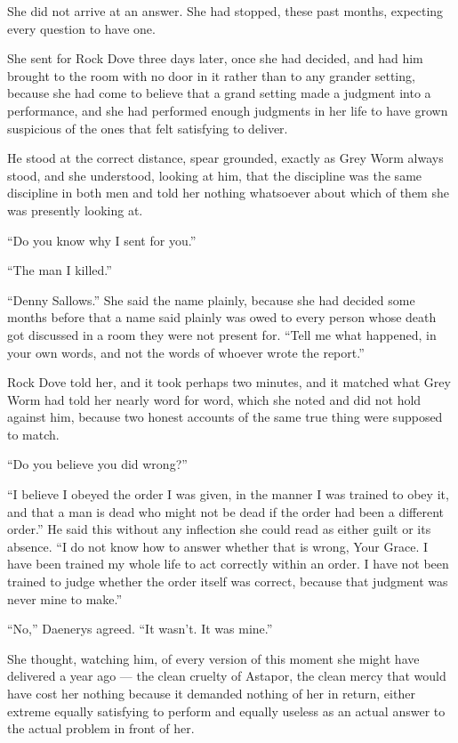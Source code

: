 She did not arrive at an answer. She had stopped, these past months, expecting every question to have one.

\sceneBreak

She sent for Rock Dove three days later, once she had decided, and had him brought to the room with no door in it rather than to any grander setting, because she had come to believe that a grand setting made a judgment into a performance, and she had performed enough judgments in her life to have grown suspicious of the ones that felt satisfying to deliver.

He stood at the correct distance, spear grounded, exactly as Grey Worm always stood, and she understood, looking at him, that the discipline was the same discipline in both men and told her nothing whatsoever about which of them she was presently looking at.

“Do you know why I sent for you.”

“The man I killed.”

“Denny Sallows.” She said the name plainly, because she had decided some months before that a name said plainly was owed to every person whose death got discussed in a room they were not present for. “Tell me what happened, in your own words, and not the words of whoever wrote the report.”

Rock Dove told her, and it took perhaps two minutes, and it matched what Grey Worm had told her nearly word for word, which she noted and did not hold against him, because two honest accounts of the same true thing were supposed to match.

“Do you believe you did wrong?”

“I believe I obeyed the order I was given, in the manner I was trained to obey it, and that a man is dead who might not be dead if the order had been a different order.” He said this without any inflection she could read as either guilt or its absence. “I do not know how to answer whether that is wrong, Your Grace. I have been trained my whole life to act correctly within an order. I have not been trained to judge whether the order itself was correct, because that judgment was never mine to make.”

“No,” Daenerys agreed. “It wasn’t. It was mine.”

\sceneBreak

She thought, watching him, of every version of this moment she might have delivered a year ago — the clean cruelty of Astapor, the clean mercy that would have cost her nothing because it demanded nothing of her in return, either extreme equally satisfying to perform and equally useless as an actual answer to the actual problem in front of her.

